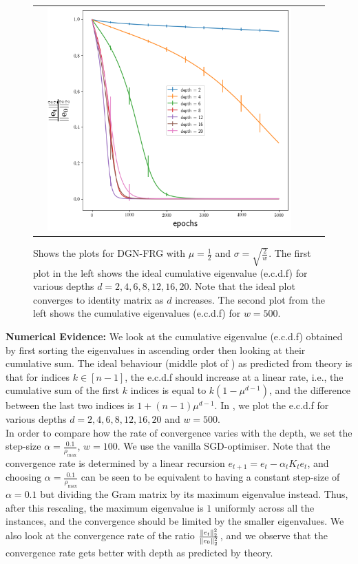 \begin{figure}
{\begin{tabular}{ccccc}
&
\includegraphics[scale=0.4]{figs/dgn-fra-conv-w500.png}
\end{tabular}
}
\caption{Shows the plots for DGN-FRG with $\mu=\frac{1}{2}$ and $\sigma=\sqrt{\frac{2}{w}}$. The first plot in the left shows the ideal cumulative eigenvalue (e.c.d.f) for various depths $d=2,4,6,8,12,16,20$. Note that the ideal plot converges to identity matrix as $d$ increases. The second plot from the left shows the cumulative eigenvalues (e.c.d.f) for $w=500$. }
\label{fig:dgn-frg-gram-ecdf}
\end{figure}
\textbf{Numerical Evidence:} We look at the cumulative eigenvalue (e.c.d.f) obtained by first sorting the eigenvalues in ascending order then looking at their cumulative sum. The ideal behaviour (middle plot of ) as predicted from theory is that for indices $k\in[n-1]$, the e.c.d.f should increase at a linear rate, i.e., the cumulative sum of the first $k$ indices is equal to $k(1-\mu^{d-1})$, and the difference between the last two indices is $1+(n-1)\mu^{d-1}$. In , we plot the e.c.d.f for various depths $d=2,4,6,8,12,16,20$ and $w=500$. \hfill\\
In order to compare how the rate of convergence varies with the depth, we set the step-size $\alpha=\frac{0.1}{\rho_{\max}}$, $w=100$. We use the vanilla SGD-optimiser. Note that the convergence rate is determined by a linear recursion $e_{t+1}=e_t-\alpha_t K_te_t$, and choosing $\alpha=\frac{0.1}{\rho_{\max}}$ can be seen to be equivalent to having a constant step-size of $\alpha=0.1$ but dividing the Gram matrix by its maximum eigenvalue instead. Thus, after this rescaling, the maximum eigenvalue is $1$ uniformly across all the instances, and the convergence should be limited by the smaller eigenvalues. We also look at the convergence rate of the ratio $\frac{\|e_t\|^2_2}{\|e_0\|^2_2}$, and we observe that the convergence rate gets better with depth as predicted by theory.
